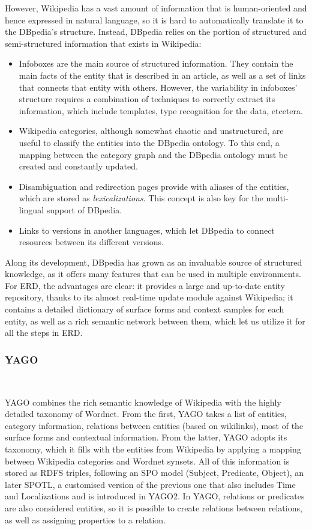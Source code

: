 However, Wikipedia has a vast amount of information that is human-oriented and hence expressed in natural language, so it is hard to automatically translate it to the DBpedia's structure. Instead, DBpedia relies on the portion of structured and semi-structured information that exists in Wikipedia:
%
\begin{itemize}
\item Infoboxes are the main source of structured information. They contain the main facts of the entity that is described in an article, as well as a set of links that connects that entity with others. However, the variability in infoboxes' structure requires a combination of techniques to correctly extract its information, which include templates, type recognition for the data, etcetera.
\item Wikipedia categories, although somewhat chaotic and unstructured, are useful to classify the entities into the DBpedia ontology. To this end, a mapping between the category graph and the DBpedia ontology must be created and constantly updated.
\item Disambiguation and redirection pages provide with aliases of the entities, which are stored as \emph{lexicalizations}. This concept is also key for the multi-lingual support of DBpedia.
\item Links to versions in another languages, which let DBpedia to connect resources between its different versions.
\end{itemize}

Along its development, DBpedia has grown as an invaluable source of structured knowledge, as it offers many features that can be used in multiple environments. For ERD, the advantages are clear: it provides a large and up-to-date entity repository, thanks to its almost real-time update module against Wikipedia; it contains a detailed dictionary of surface forms and context samples for each entity, as well as a rich semantic network between them, which let us utilize it for all the steps in ERD.

\subsubsection{YAGO}~

YAGO \cite{yago2007,yago2013,yago2015} combines the rich semantic knowledge of Wikipedia with the highly detailed taxonomy of Wordnet. From the first, YAGO takes a list of entities, category information, relations between entities (based on wikilinks), most of the surface forms and contextual information. From the latter, YAGO adopts its taxonomy, which it fills with the entities from Wikipedia by applying a mapping between Wikipedia categories and Wordnet synsets. All of this information is stored as RDFS triples, following an SPO model (Subject, Predicate, Object), an later SPOTL, a customised version of the previous one that also includes Time and Localizations and is introduced in YAGO2. In YAGO, relations or predicates are also considered entities, so it is possible to create relations between relations, as well as assigning properties to a relation.

